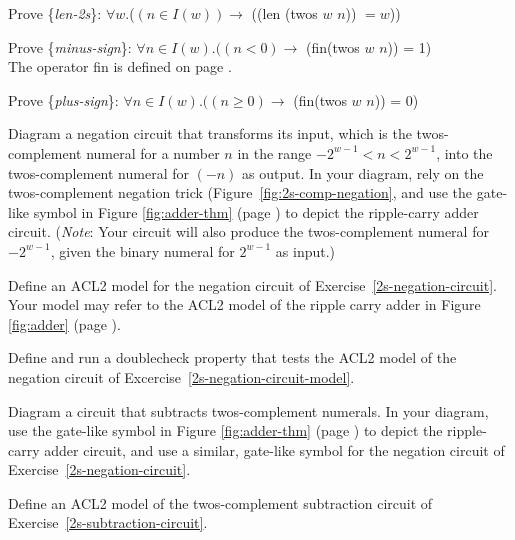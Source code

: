 \begin{ExerciseList}

\Exercise \label{len-2s}
Prove \{\emph{len-2s}\}:
$\forall w$.($(n \in I(w)) \rightarrow$ ((len (twos $w$ $n$)) $= w$))

\Exercise \label{minus-sign}
Prove \{\emph{minus-sign}\}:
$\forall n \in I(w).((n < 0) \rightarrow$ (fin(twos $w$ $n$)) = 1) \\
The operator fin is defined on page \pageref{fin-defun}.

\Exercise \label{plus-sign}
Prove \{\emph{plus-sign}\}:
$\forall n \in I(w).((n \ge 0) \rightarrow$ (fin(twos $w$ $n$)) = $0$)

\Exercise \label{2s-negation-circuit}
Diagram a negation circuit that transforms its input,
which is the twos-complement numeral for a number $n$ in the range
$-2^{w-1} < n < 2^{w-1}$,
into the twos-complement numeral for $(-n)$ as output.
In your diagram, rely on the twos-complement negation trick
(Figure~\ref{fig:2s-comp-negation},
and use the gate-like symbol in
Figure \ref{fig:adder-thm} (page \pageref{fig:adder-thm})
to depict the ripple-carry adder circuit.
(\emph{Note}: Your circuit will also produce the twos-complement
numeral for $-2^{w-1}$, given the binary numeral for $2^{w-1}$
as input.)

\Exercise \label{2s-negation-circuit-model}
Define an ACL2 model for the negation circuit
of Exercise~\ref{2s-negation-circuit}.
Your model may refer to the ACL2 model
of the ripple carry adder in
Figure \ref{fig:adder} (page \pageref{fig:adder}).

\Exercise Define and run a doublecheck property that
tests the ACL2 model of the negation circuit of
Excercise~\ref{2s-negation-circuit-model}.

\Exercise \label{2s-subtraction-circuit}
Diagram a circuit that subtracts twos-complement numerals.
In your diagram, use the gate-like symbol in
Figure \ref{fig:adder-thm} (page \pageref{fig:adder-thm})
to depict the ripple-carry adder circuit,
and use a similar, gate-like symbol for the negation circuit
of Exercise~\ref{2s-negation-circuit}.

\Exercise \label{2s-subtraction-circuit-model}
Define an ACL2 model of the twos-complement
subtraction circuit of Exercise~\ref{2s-subtraction-circuit}.


\end{ExerciseList}
